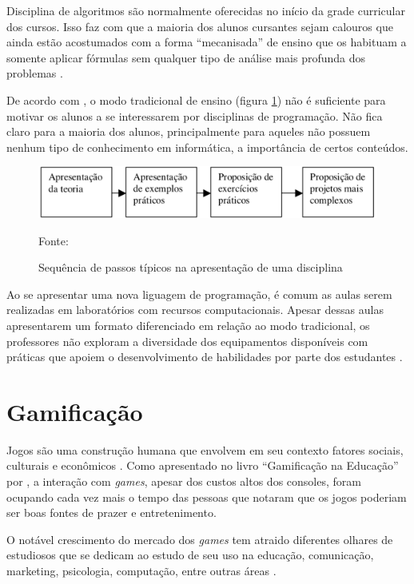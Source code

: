 Disciplina de algoritmos são normalmente oferecidas no início da grade curricular dos cursos. Isso faz com que a maioria dos alunos
cursantes sejam calouros que ainda estão acostumados com a forma ``mecanisada'' de ensino que os habituam a somente aplicar fórmulas 
sem qualquer tipo de análise mais profunda dos problemas \cite{KOLIVER}.

De acordo com , o modo tradicional de ensino (figura \ref{figura4}) não é suficiente para motivar os alunos a se
interessarem por disciplinas de programação. Não fica claro para a maioria dos alunos, principalmente para aqueles
não possuem nenhum tipo de conhecimento em informática, a importância de certos conteúdos.

\begin{figure}[h]
	\centering
	\includegraphics[keepaspectratio=true,scale=0.34]{figuras/modoTradicional.png}
	\caption{Sequência de passos típicos na apresentação de uma disciplina}
	Fonte: \cite{Borges}
	\label{figura4}
\end{figure}

Ao se apresentar uma nova liguagem de programação, é comum as aulas serem realizadas em laboratórios com
recursos computacionais. Apesar dessas aulas apresentarem um formato diferenciado em relação ao modo tradicional,
os professores não exploram a diversidade dos equipamentos disponíveis com práticas que apoiem o desenvolvimento 
de habilidades por parte dos estudantes \cite{Borges}.

\section{Gamificação}
Jogos são uma construção humana que envolvem em seu contexto fatores sociais, culturais e econômicos \cite{EaDF440}.
Como apresentado no livro ``Gamificação na Educação'' por , a interação com \textit{games}, apesar
dos custos altos dos consoles, foram ocupando cada vez mais o tempo das pessoas que notaram que os jogos poderiam ser boas fontes
de prazer e entretenimento.

O notável crescimento do mercado dos \textit{games} tem atraido diferentes olhares de estudiosos que se dedicam ao estudo de seu
uso na educação, comunicação, marketing, psicologia, computação, entre outras áreas \cite{da2014gamificaccao}.


